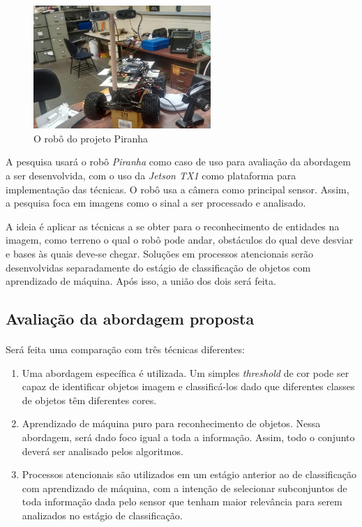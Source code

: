 \documentclass[11pt]{article}
\newcommand{\tit}[1]{\textit{#1}}
\begin{document}
\begin{figure}[H]
  		\centering
    	\includegraphics[width=0.6\textwidth]{imgs/piranha.jpg}
		\caption[9pt]{O robô do projeto Piranha}
\end{figure}

A pesquisa usará o robô \tit{Piranha} como caso de uso para
avaliação da abordagem a ser desenvolvida, com o uso da \tit{Jetson TX1} 
como plataforma para implementação das técnicas.
O robô usa a câmera como principal sensor.
Assim, a pesquisa foca em imagens como o sinal a ser processado e analisado. 

A ideia é aplicar as técnicas a se obter para o reconhecimento
de entidades na imagem, como terreno o qual o robô pode andar, obstáculos do
qual deve desviar e bases às quais deve-se chegar.
Soluções em processos atencionais serão desenvolvidas separadamente do
estágio de classificação de objetos com aprendizado de máquina. 
Após isso, a união dos dois será feita.

\subsection{Avaliação da abordagem proposta}
\paragraph{}
Será feita uma comparação com três técnicas diferentes: 
\begin{enumerate}
	\item Uma abordagem específica é utilizada.  
		Um simples \tit{threshold} de cor pode ser capaz de identificar objetos
		imagem e classificá-los dado que diferentes classes de objetos têm
		diferentes cores.
	\item Aprendizado de máquina puro para reconhecimento de objetos.
		Nessa abordagem, será dado foco igual a toda a informação. 
		Assim, todo o conjunto deverá ser analisado pelos algoritmos.
	\item Processos atencionais são utilizados em um estágio anterior ao de 
		classificação com aprendizado de máquina, com a intenção de selecionar
		subconjuntos de toda informação dada pelo sensor que tenham maior 
		relevância para serem analizados no estágio de classificação.
\end{enumerate}
\end{document}
